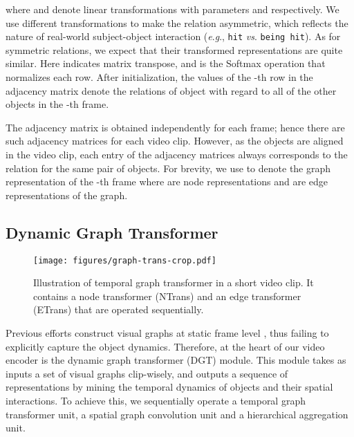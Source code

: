 \documentclass[10pt,journal,compsoc]{IEEEtran}
\newcommand{\vs}{\textit{vs}. }
\newcommand{\eg}{\textit{e}.\textit{g}.}
\begin{document}
where  and  denote linear transformations with parameters  and  respectively. We use different transformations to make the relation asymmetric, which reflects the nature of real-world subject-object interaction \cite{xiao2020visual,krishna2018referring} (\eg, \texttt{hit} \vs \texttt{being hit}). As for symmetric relations, we expect that their transformed representations are quite similar. Here  indicates matrix transpose, and  is the Softmax operation that normalizes each row. After initialization, the values of the -th row in the adjacency matrix  denote the relations of object  with regard to all of the other objects in the -th frame. 

The adjacency matrix  is obtained independently for each frame; hence there are  such adjacency matrices for each video clip.  However, as the objects are aligned in the video clip, each entry of the adjacency matrices always corresponds to the relation for the same pair of objects. For brevity, we use  to denote the graph representation of the -th frame where  are node representations and  are edge representations of the graph.

\subsection{Dynamic Graph Transformer}
\label{sec:dgt}
\begin{figure}[t]
  \begin{center}
    \texttt{[image: figures/graph-trans-crop.pdf]}
  \end{center}
  \vspace{-0.3cm}
  \caption{Illustration of temporal graph transformer in a short video clip. It contains a node transformer (NTrans) and an edge transformer (ETrans) that are operated sequentially. }
  \vspace{-0.4cm}
  \label{fig:dgt}
\end{figure}
Previous efforts construct visual graphs at static frame level \cite{xiao2021video, peng2021progressive,liu2021hair}, thus failing to explicitly capture the object dynamics. Therefore, at the heart of our video encoder is the dynamic graph transformer (DGT) module. This module takes as inputs a set of visual graphs  clip-wisely, and outputs a sequence of representations  by mining the temporal dynamics of objects and their spatial interactions. To achieve this, we sequentially operate a temporal graph transformer unit, a spatial graph convolution unit and a hierarchical aggregation unit. 
\end{document}
